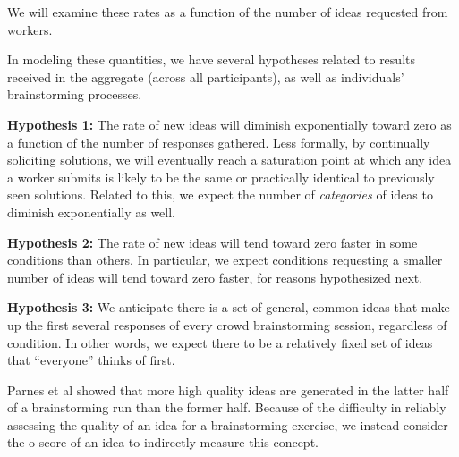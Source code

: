 We will examine these rates as a function of the number of ideas requested from workers.



In modeling these quantities, we have several hypotheses related to results received in the aggregate (across all participants), as well as individuals' brainstorming processes.

\textbf{Hypothesis 1:} The rate of new ideas will diminish exponentially toward zero as a function of the number of responses gathered. Less formally, by continually soliciting solutions, we will eventually reach a saturation point at which any idea a worker submits is likely to be the same or practically identical to previously seen solutions. Related to this, we expect the number of \emph{categories} of ideas to diminish exponentially as well.

\textbf{Hypothesis 2:} The rate of new ideas will tend toward zero faster in some conditions than others. In particular, we expect conditions requesting a smaller number of ideas will tend toward zero faster, for reasons hypothesized next.

\textbf{Hypothesis 3:} We anticipate there is a set of general, common ideas that make up the first several responses of every crowd brainstorming session, regardless of condition. In other words, we expect there to be a relatively fixed set of ideas that ``everyone'' thinks of first.

Parnes et al \cite{parnes_effects_1961} showed that more high quality ideas are generated in the latter half of a brainstorming run than the former half. Because of the difficulty in reliably assessing the quality of an idea for a brainstorming exercise, we instead consider the o-score of an idea to indirectly measure this concept.

